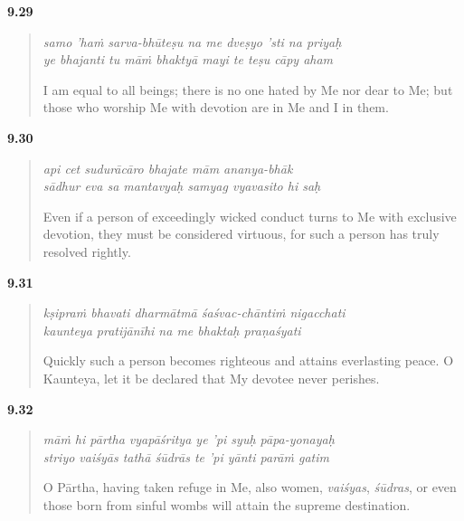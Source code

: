 \par\noindent\textbf{9.29}\par
\begin{verse}
\textit{samo ’haṁ sarva-bhūteṣu na me dveṣyo ’sti na priyaḥ} \\
\textit{ye bhajanti tu māṁ bhaktyā mayi te teṣu cāpy aham}

\noindent I am equal to all beings; there is no one hated by Me nor dear to Me; but those who worship Me with devotion are in Me and I in them.
\end{verse}
\par



\par\noindent\textbf{9.30}\par
\begin{verse}
\textit{api cet sudurācāro bhajate mām ananya-bhāk} \\
\textit{sādhur eva sa mantavyaḥ samyag vyavasito hi saḥ}

\noindent Even if a person of exceedingly wicked conduct turns to Me with exclusive devotion, they must be considered virtuous, for such a person has truly resolved rightly.
\end{verse}
\par



\par\noindent\textbf{9.31}\par
\begin{verse}
\textit{kṣipraṁ bhavati dharmātmā śaśvac-chāntiṁ nigacchati} \\
\textit{kaunteya pratijānīhi na me bhaktaḥ praṇaśyati}

\noindent Quickly such a person becomes righteous and attains everlasting peace. O Kaunteya, let it be declared that My devotee never perishes.
\end{verse}
\par



\par\noindent\textbf{9.32}\par
\begin{verse}
\textit{māṁ hi pārtha vyapāśritya ye ’pi syuḥ pāpa-yonayaḥ} \\
\textit{striyo vaiśyās tathā śūdrās te ’pi yānti parāṁ gatim}

\noindent O Pārtha, having taken refuge in Me, also women, \textit{vaiśyas}, \textit{śūdras}, or even those born from sinful wombs will attain the supreme destination.
\end{verse}
\par



